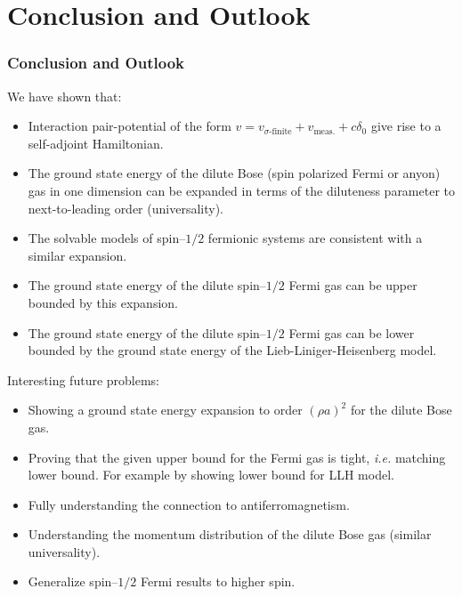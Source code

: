 \documentclass{beamer}[10]
\newcommand{\ie}{\emph{i.e.} }
\begin{document}
\section{Conclusion and Outlook}
\begin{frame}
	\frametitle{Conclusion and Outlook}
	\small
	\begin{block}{We have shown that:}
		\small
		\begin{itemize}
			\item Interaction pair-potential of the form $v=v_{\sigma\text{-finite}}+v_{\text{meas.}}+c\delta_0$ give rise to a self-adjoint Hamiltonian.
			\item The ground state energy of the dilute Bose (spin polarized Fermi or anyon) gas in one dimension can be expanded in terms of the diluteness parameter to next-to-leading order (universality).
			\item The solvable models of spin--$1/2$ fermionic systems are consistent with a similar expansion.
			\item The ground state energy of the dilute spin--$1/2$ Fermi gas can be upper bounded by this expansion.
			\item The ground state energy of the dilute spin--$1/2$ Fermi gas can be lower bounded by the ground state energy of the Lieb-Liniger-Heisenberg model.
		\end{itemize}
	\end{block}
	
\end{frame}
\begin{frame}
	\begin{block}{Interesting future problems:}
		\begin{itemize}
			\item Showing a ground state energy expansion to order $(\rho a)^2$ for the dilute Bose gas.
			\item  Proving that the given upper bound for the Fermi gas is tight, \ie matching lower bound. For example by showing lower bound for LLH model.
			\item Fully understanding the connection to antiferromagnetism.
			\item Understanding the momentum distribution of the dilute Bose gas (similar universality).
			\item Generalize spin--$1/2$ Fermi results to higher spin.
		\end{itemize}
	\end{block}
\end{frame}

\begin{frame}
\end{frame}
\end{document}
